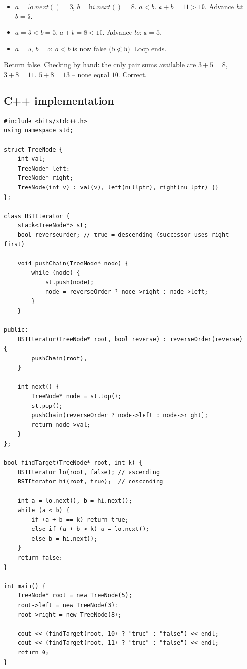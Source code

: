 \begin{itemize}
  \item $a=\textit{lo.next}()=3$, $b=\textit{hi.next}()=8$. $a<b$.
        $a+b=11>10$. Advance \textit{hi}: $b=5$.
  \item $a=3<b=5$. $a+b=8<10$. Advance \textit{lo}: $a=5$.
  \item $a=5$, $b=5$: $a<b$ is now false ($5 \not< 5$). Loop ends.
\end{itemize}

Return false. Checking by hand: the only pair sums available are
$3{+}5{=}8$, $3{+}8{=}11$, $5{+}8{=}13$ -- none equal $10$. Correct.

\subsection*{C++ implementation}

\begin{lstlisting}
#include <bits/stdc++.h>
using namespace std;

struct TreeNode {
    int val;
    TreeNode* left;
    TreeNode* right;
    TreeNode(int v) : val(v), left(nullptr), right(nullptr) {}
};

class BSTIterator {
    stack<TreeNode*> st;
    bool reverseOrder; // true = descending (successor uses right first)

    void pushChain(TreeNode* node) {
        while (node) {
            st.push(node);
            node = reverseOrder ? node->right : node->left;
        }
    }

public:
    BSTIterator(TreeNode* root, bool reverse) : reverseOrder(reverse) {
        pushChain(root);
    }

    int next() {
        TreeNode* node = st.top();
        st.pop();
        pushChain(reverseOrder ? node->left : node->right);
        return node->val;
    }
};

bool findTarget(TreeNode* root, int k) {
    BSTIterator lo(root, false); // ascending
    BSTIterator hi(root, true);  // descending

    int a = lo.next(), b = hi.next();
    while (a < b) {
        if (a + b == k) return true;
        else if (a + b < k) a = lo.next();
        else b = hi.next();
    }
    return false;
}

int main() {
    TreeNode* root = new TreeNode(5);
    root->left = new TreeNode(3);
    root->right = new TreeNode(8);

    cout << (findTarget(root, 10) ? "true" : "false") << endl;
    cout << (findTarget(root, 11) ? "true" : "false") << endl;
    return 0;
}
\end{lstlisting}

